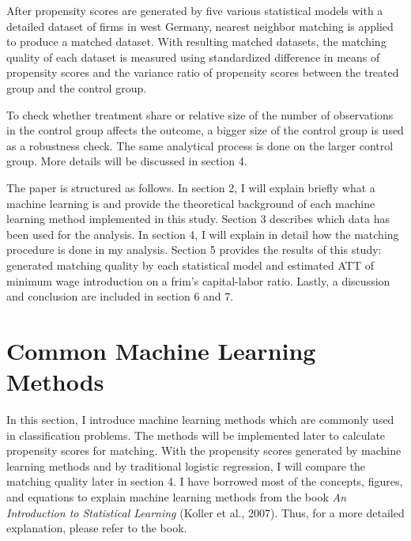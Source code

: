 \documentclass[11pt,a4paper,oneside]{article}
\begin{document}
\par
After propensity scores are generated by five various statistical models with a detailed dataset of firms in west Germany, nearest neighbor matching is applied to produce a matched dataset. With resulting matched datasets,  the matching quality of each dataset is measured using standardized difference in means of propensity scores and the variance ratio of propensity scores between the treated group and the control group. 
\par
To check whether treatment share or relative size of the number of observations in the control group affects the outcome, a bigger size of the control group is used as a robustness check. The same analytical process is done on the larger control group. More details will be discussed in section 4. 
\par
The paper is structured as follows. In section 2, I will explain briefly what a machine learning is and provide the theoretical background of each machine learning method implemented in this study. Section 3 describes which data has been used for the analysis. In section 4, I will explain in detail how the matching procedure is done in my analysis. Section 5 provides the results of this study: generated matching quality by each statistical model and estimated ATT of minimum wage introduction on a frim's capital-labor ratio. Lastly, a discussion and conclusion are included in section 6 and 7.
\section{Common Machine Learning Methods}
In this section, I introduce machine learning methods which are commonly used in classification problems. The methods will be implemented later to calculate propensity scores for matching. With the propensity scores generated by machine learning methods and by traditional logistic regression, I will compare the matching quality later in section 4. I have borrowed most of the concepts, figures, and equations to explain machine learning methods from the book \emph{An Introduction to Statistical Learning} (Koller et al., 2007).\cite{koller2007introduction} Thus, for a more detailed explanation, please refer to the book.
\end{document}
